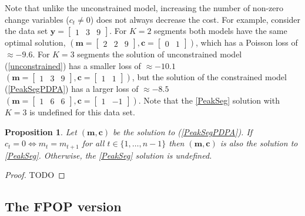 \documentclass{article}
\newtheorem{Proposition}{Proposition}
\begin{document}
Note that unlike the unconstrained model, increasing the number of
non-zero change variables ($c_t\neq 0$) does not always decrease the
cost. For example, consider the data set
$\mathbf y = \left[\begin{array}{ccc}1 & 3 & 9 \end{array}\right]$.
For $K=2$ segments both models have the same optimal solution,
$(\mathbf m = \left[\begin{array}{ccc}2 & 2 & 9 \end{array}\right],
  \mathbf c = \left[\begin{array}{cc}  0 & 1 \end{array}\right])$,
which has a Poisson loss of $\approx -9.6$. 
For $K=3$ segments the solution of unconstrained model
(\ref{unconstrained}) has a smaller loss of $\approx -10.1$
$(\mathbf m = \left[\begin{array}{ccc}1 & 3 & 9 \end{array}\right],
  \mathbf c = \left[\begin{array}{cc}  1 & 1 \end{array}\right])$,
but the solution of the constrained model (\ref{PeakSegPDPA})
has a larger loss of $\approx -8.5$
$(\mathbf m = \left[\begin{array}{ccc}1 & 6 & 6 \end{array}\right],
  \mathbf c = \left[\begin{array}{cc}  1 & -1  \end{array}\right])$. 
Note that the \ref{PeakSeg} solution with $K=3$ is undefined for this data set.

\begin{Proposition}
  Let $(\mathbf m, \mathbf c)$ be the solution to
  (\ref{PeakSegPDPA}). If $c_t=0 \Leftrightarrow m_t = m_{t+1}$ for
  all $t\in\{1, \dots, n-1\}$ then $(\mathbf m, \mathbf c)$ is also
  the solution to \ref{PeakSeg}. Otherwise, the \ref{PeakSeg} solution
  is undefined.
\end{Proposition}

\begin{proof}
  TODO
\end{proof}

\subsection{The FPOP version}
\end{document}
